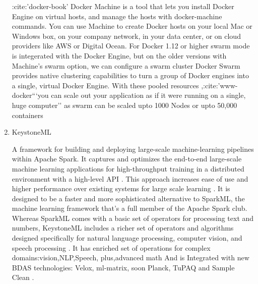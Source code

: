\begin{enumerate}
:cite:'docker-book' Docker Machine is a tool that lets you install
Docker Engine on virtual hosts, and manage the hosts with
docker-machine commands. You can use Machine to create Docker
hosts on your local Mac or Windows box, on your company network,
in your data center, or on cloud providers like AWS or Digital
Ocean. For Docker 1.12 or higher swarm mode is integerated with
the Docker Engine, but on the older versions with Machine's swarm
option, we can configure a swarm cluster Docker Swarm provides
native clustering capabilities to turn a group of Docker engines
into a single, virtual Docker Engine. With these pooled resources
,:cite:'www-docker```you can scale out your application as if it
were running on a single, huge computer'' as swarm can be scaled
upto 1000 Nodes or upto 50,000 containers

\item {} 
KeystoneML

A framework for building and deploying large-scale
machine-learning pipelines within Apache Spark. It captures and
optimizes the end-to-end large-scale machine learning applications
for high-throughput training in a distributed environment with a
high-level API \label{\detokenize{i524/technologies:id60}}{\hyperref[\detokenize{i524/technologies:sparks2016keystoneml}]{\sphinxcrossref{{[}52{]}}}}. This approach
increases ease of use and higher performance over existing systems
for large scale learning \label{\detokenize{i524/technologies:id61}}{\hyperref[\detokenize{i524/technologies:sparks2016keystoneml}]{\sphinxcrossref{{[}52{]}}}}. It is
designed to be a faster and more sophisticated alternative to
SparkML, the machine learning framework that’s a full member of
the Apache Spark club. Whereas SparkML comes with a basic set of
operators for processing text and numbers, KeystoneML includes a
richer set of operators and algorithms designed specifically for
natural language processing, computer vision, and speech
processing \label{\detokenize{i524/technologies:id62}}{\hyperref[\detokenize{i524/technologies:building}]{\sphinxcrossref{{[}53{]}}}}. It has enriched set of operations for
complex domains:vision,NLP,Speech, plus,advanced math And is
Integrated with new BDAS technologies: Velox, ml-matrix, soon
Planck, TuPAQ and Sample Clean \label{\detokenize{i524/technologies:id63}}{\hyperref[\detokenize{i524/technologies:spark}]{\sphinxcrossref{{[}54{]}}}}.

\end{enumerate}


